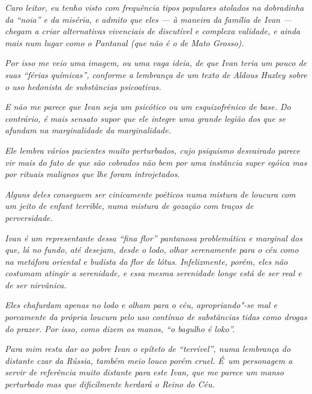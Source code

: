 \emph{Caro leitor, eu tenho visto com frequência tipos populares
atolados na dobradinha da ``noia'' e da miséria, e admito que eles --- à
maneira da família de Ivan --- chegam a criar alternativas vivenciais de
discutível e complexa validade, e ainda mais num lugar como o Pantanal
(que não é o de Mato Grosso).}~

\emph{Por isso me veio uma imagem, ou uma vaga ideia, de que Ivan teria
um pouco de suas ``férias químicas'', conforme a lembrança de um texto
de Aldous Huxley sobre o uso hedonista de substâncias psicoativas.}~

\emph{E não me parece que Ivan seja um psicótico ou um esquizofrênico de
base. Do contrário, é mais sensato supor que ele integre uma grande
legião dos que se afundam na marginalidade da marginalidade.}~

\emph{Ele lembra vários pacientes muito perturbados, cujo psiquismo
desvairado parece vir mais do fato de que são cobrados não bem por uma
instância super egóica mas por rituais malignos que lhe foram
introjetados.}~

\emph{Alguns deles conseguem ser cinicamente poéticos numa mistura de
loucura com um jeito de enfant terrible, numa mistura de gozação com
traços de perversidade.}~

\emph{Ivan é um representante dessa ``fina flor'' pantanosa problemática
e marginal dos que, lá no fundo, até desejam, desde o lodo, olhar
serenamente para o céu como na metáfora oriental e budista da flor de
lótus. Infelizmente, porém, eles não costumam atingir a serenidade, e
essa mesma serenidade longe está de ser real e de ser nirvânica.}~

\emph{Eles chafurdam apenas no lodo e olham para o céu, apropriando"-se
mal e porcamente da própria loucura pelo uso contínuo de substâncias
tidas como drogas do prazer. Por isso, como dizem os manos, ``o bagulho
é loko''.}

\emph{Para mim resta dar ao pobre Ivan o epíteto de ``terrível'', numa
lembrança do distante czar da Rússia, também meio louco porém cruel. É~um personagem a servir de referência muito distante para este Ivan, que me
parece um manso perturbado mas que dificilmente herdará o Reino do Céu.}
\endgroup